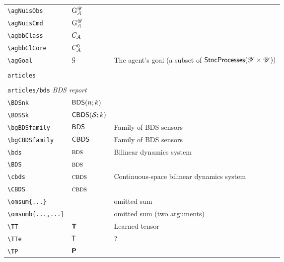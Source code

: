 \begin{longtable}{lll}
 {\color[rgb]{0.5,0.5,0.5}\texttt{\textbackslash agNuisObs}} & $\mathrm{G}_{\mathcal{A}}^{\mathscr{Y}}$ & \\ 
 {\color[rgb]{0.5,0.5,0.5}\texttt{\textbackslash agNuisCmd}} & $\mathrm{G}_{\mathcal{A}}^{\mathscr{U}}$ & \\ 
 {\color[rgb]{0.5,0.5,0.5}\texttt{\textbackslash agbbClass}} & $C_{\mathcal{A}}$ & \\ 
 {\color[rgb]{0.5,0.5,0.5}\texttt{\textbackslash agbbClCore}} & $C_{\mathcal{A}}^{0}$ & \\ 
 {\color[rgb]{0.5,0.5,0.5}\texttt{\textbackslash agGoal}} & $\mathcal{G}$ &  The agent's goal (a subset of $\mathsf{StocProcesses}(\mathscr{Y}\times\mathscr{U}))$\\ 
  &  & \\ 
 \multicolumn{3}{l}{{\color[rgb]{0.5,0.5,0.5}\texttt{articles}} \emph{}}\\ 
 \hline
\hline
 &  & \\ 
 \multicolumn{3}{l}{{\color[rgb]{0.5,0.5,0.5}\texttt{articles/bds}} \emph{BDS report}}\\ 
 \hline
{\color[rgb]{0.5,0.5,0.5}\texttt{\textbackslash BDSnk}} & $\mathsf{BDS}(n;k)$ & \\ 
 {\color[rgb]{0.5,0.5,0.5}\texttt{\textbackslash BDSSk}} & $\BDSSk$ & \\ 
 {\color[rgb]{0.5,0.5,0.5}\texttt{\textbackslash bgBDSfamily}} & $\mathsf{BDS}$ &  Family of BDS sensors\\ 
 {\color[rgb]{0.5,0.5,0.5}\texttt{\textbackslash bgCBDSfamily}} & $\mathsf{CBDS}$ &  Family of BDS sensors\\ 
 {\color[rgb]{0.5,0.5,0.5}\texttt{\textbackslash bds}} & $\textsc{bds}$ &  Bilinear dynamics system\\ 
 {\color[rgb]{0.5,0.5,0.5}\texttt{\textbackslash BDS}} & $\textsc{bds}$ & \\ 
 {\color[rgb]{0.5,0.5,0.5}\texttt{\textbackslash cbds}} & $\textsc{cbds}$ &  Continuous-space bilinear dynamics system\\ 
 {\color[rgb]{0.5,0.5,0.5}\texttt{\textbackslash CBDS}} & $\textsc{cbds}$ & \\ 
 {\color[rgb]{0.5,0.5,0.5}\texttt{\textbackslash omsum\{...\}}} &  &  omitted sum\\ 
 {\color[rgb]{0.5,0.5,0.5}\texttt{\textbackslash omsumb\{...,...\}}} &  &  omitted sum (two arguments)\\ 
 {\color[rgb]{0.5,0.5,0.5}\texttt{\textbackslash TT}} & $\boldsymbol{{\mathsf{T}}}$ &  Learned tensor\\ 
 {\color[rgb]{0.5,0.5,0.5}\texttt{\textbackslash TTe}} & ${\mathsf{T}}$ &  ?\\ 
 {\color[rgb]{0.5,0.5,0.5}\texttt{\textbackslash TP}} & $\boldsymbol{{\mathsf{P}}}$ & \\ 

\end{longtable}
